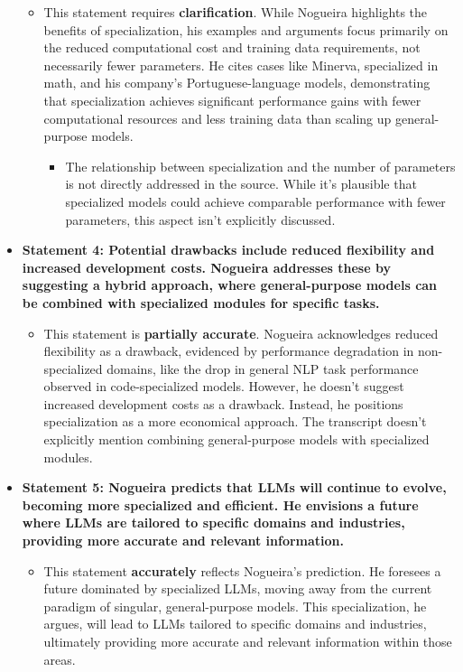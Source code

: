 \documentclass[
]{article}
\begin{document}
\begin{itemize}
  \begin{itemize}
  \item
    This statement requires \textbf{clarification}. While Nogueira
    highlights the benefits of specialization, his examples and
    arguments focus primarily on the reduced computational cost and
    training data requirements, not necessarily fewer parameters. He
    cites cases like Minerva, specialized in math, and his company's
    Portuguese-language models, demonstrating that specialization
    achieves significant performance gains with fewer computational
    resources and less training data than scaling up general-purpose
    models.

    \begin{itemize}
    
    \item
      The relationship between specialization and the number of
      parameters is not directly addressed in the source. While it's
      plausible that specialized models could achieve comparable
      performance with fewer parameters, this aspect isn't explicitly
      discussed.
    \end{itemize}
  \end{itemize}
\item
  \textbf{Statement 4: Potential drawbacks include reduced flexibility
  and increased development costs. Nogueira addresses these by
  suggesting a hybrid approach, where general-purpose models can be
  combined with specialized modules for specific tasks.}

  \begin{itemize}
  
  \item
    This statement is \textbf{partially accurate}. Nogueira acknowledges
    reduced flexibility as a drawback, evidenced by performance
    degradation in non-specialized domains, like the drop in general NLP
    task performance observed in code-specialized models. However, he
    doesn't suggest increased development costs as a drawback. Instead,
    he positions specialization as a more economical approach. The
    transcript doesn't explicitly mention combining general-purpose
    models with specialized modules.
  \end{itemize}
\item
  \textbf{Statement 5: Nogueira predicts that LLMs will continue to
  evolve, becoming more specialized and efficient. He envisions a future
  where LLMs are tailored to specific domains and industries, providing
  more accurate and relevant information.}

  \begin{itemize}
  
  \item
    This statement \textbf{accurately} reflects Nogueira's prediction.
    He foresees a future dominated by specialized LLMs, moving away from
    the current paradigm of singular, general-purpose models. This
    specialization, he argues, will lead to LLMs tailored to specific
    domains and industries, ultimately providing more accurate and
    relevant information within those areas.
  \end{itemize}
\end{itemize}
\end{document}
